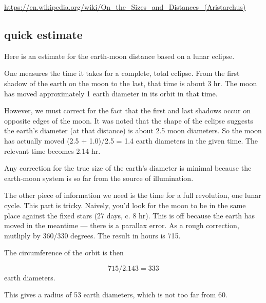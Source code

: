 \documentclass[11pt, oneside]{article}
\begin{document}
\url{https://en.wikipedia.org/wiki/On_the_Sizes_and_Distances_(Aristarchus)}

\subsection*{quick estimate}

Here is an estimate for the earth-moon distance based on a lunar eclipse.

One measures the time it takes for a complete, total eclipse.  From the first shadow of the earth on the moon to the last, that time is about 3 hr.  The moon has moved approximately 1 earth diameter in its orbit in that time.

However, we must correct for the fact that the first and last shadows occur on opposite edges of the moon.  It was noted that the shape of the eclipse suggests the earth's diameter (at that distance) is about 2.5 moon diameters.  So the moon has actually moved (2.5 + 1.0)/2.5 = 1.4 earth diameters in the given time.  The relevant time becomes 2.14 hr.

Any correction for the true size of the earth's diameter is minimal because the earth-moon system is so far from the source of illumination.

The other piece of information we need is the time for a full revolution, one lunar cycle.  This part is tricky.  Naively, you'd look for the moon to be in the same place against the fixed stars (27 days, c. 8 hr).  This is off because the earth has moved in the meantime --- there is a parallax error.  As a rough correction, mutliply by 360/330 degrees.  The result in hours is 715.

The circumference of the orbit is then

\[ 715 / 2.143 = 333 \]
earth diameters.

This gives a radius of 53 earth diameters, which is not too far from 60.
\end{document}
